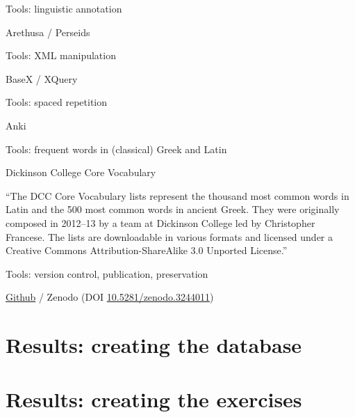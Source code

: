 \documentclass{beamer}
\begin{document}
\begin{frame}{Tools: linguistic annotation}

Arethusa / Perseids

\end{frame}

\begin{frame}{Tools: XML manipulation}

BaseX / XQuery

\end{frame}

\begin{frame}{Tools: spaced repetition}

Anki

\end{frame}

\begin{frame}{Tools: frequent words in (classical) Greek and Latin}

\alert{Dickinson College Core Vocabulary}

``The DCC Core Vocabulary lists represent the thousand most common words in Latin and the 500 most common words in ancient Greek. They were originally composed in 2012–13 by a team at Dickinson College led by \alert{Christopher Francese}. The lists are downloadable in various formats and licensed under a Creative Commons Attribution-ShareAlike 3.0 Unported License.''

\end{frame}

\begin{frame}{Tools: version control, publication, preservation}

\href{https://github.com/nevenjovanovic/sunoikisis2019zg-eklogai}{Github} / Zenodo (DOI \href{https://doi.org/10.5281/zenodo.3244011}{10.5281/zenodo.3244011})



\end{frame}

\section{Results: creating the database}

\begin{frame}[standout]


\end{frame}

\section{Results: creating the exercises}
\end{document}
